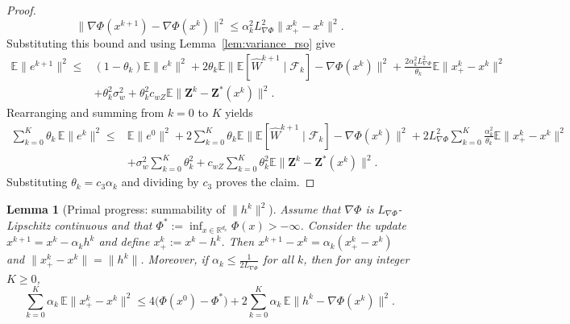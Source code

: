 \documentclass{pkumelon}
\theoremstyle{plain}
\newtheorem{lemma}{Lemma}
\newcommand{\R}{\mathbb{R}}
\newcommand{\E}{\mathbb{E}}
\newcommand{\Phiobj}{\Phi}
\begin{document}
\begin{proof}
\begin{equation*}
\|\nabla\Phiobj(x^{k+1})-\nabla\Phiobj(x^k)\|^2 \le \alpha_k^2L_{\nabla\Phi}^2\|x_+^k-x^k\|^2.
\end{equation*}
Substituting this bound and using Lemma~\ref{lem:variance_rso} give
\begin{equation*}
\begin{aligned}
\E\|e^{k+1}\|^2
\le{}&
(1-\theta_k)\E\|e^k\|^2
+2\theta_k\E\|\E[\widehat W^{k+1}\mid \mathcal F_k]-\nabla\Phiobj(x^k)\|^2+\frac{2\alpha_k^2L_{\nabla\Phi}^2}{\theta_k}\E\|x_+^k-x^k\|^2 \\
&+\theta_k^2\sigma_w^2
+\theta_k^2c_{wZ}\E\|\boldsymbol Z^k-\boldsymbol Z^*(x^k)\|^2.
\end{aligned}
\end{equation*}
Rearranging and summing from $k=0$ to $K$ yields
{\small
\begin{equation*}
\begin{aligned}
\sum_{k=0}^{K}\theta_k\,\E\|e^k\|^2
\le{}&
\E\|e^0\|^2
+2\sum_{k=0}^{K}\theta_k\E\|\E[\widehat W^{k+1}\mid \mathcal F_k]-\nabla\Phiobj(x^k)\|^2+2L_{\nabla\Phi}^2\sum_{k=0}^{K}\frac{\alpha_k^2}{\theta_k}\E\|x_+^k-x^k\|^2 \\
&+\sigma_w^2\sum_{k=0}^{K}\theta_k^2
+c_{wZ}\sum_{k=0}^{K}\theta_k^2\E\|\boldsymbol Z^k-\boldsymbol Z^*(x^k)\|^2.
\end{aligned}
\end{equation*}
}
Substituting $\theta_k=c_3\alpha_k$ and dividing by $c_3$ proves the claim.
\end{proof}

\begin{lemma}[Primal progress: summability of $\|h^k\|^2$]\label{lem:primal_sum_h}
Assume that $\nabla\Phiobj$ is $L_{\nabla\Phi}$-Lipschitz continuous and that $\Phiobj^*:=\inf_{x\in\R^{d_x}}\Phiobj(x)>-\infty$. Consider the update $x^{k+1}=x^k-\alpha_k h^k$ and define $x_+^k:=x^k-h^k$. Then $x^{k+1}-x^k=\alpha_k(x_+^k-x^k)$ and $\|x_+^k-x^k\|=\|h^k\|$. Moreover, if $\alpha_k\le \frac{1}{2L_{\nabla\Phi}}$ for all $k$, then for any integer $K\ge 0$,
\begin{equation}\label{eq:sum_alpha_hk_bound}
\sum_{k=0}^{K}\alpha_k\,\E\|x_+^k-x^k\|^2
\le 4\bigl(\Phiobj(x^0)-\Phiobj^*\bigr)+2\sum_{k=0}^{K}\alpha_k\,\E\|h^k-\nabla\Phiobj(x^k)\|^2.
\end{equation}
\end{lemma}
\end{document}
